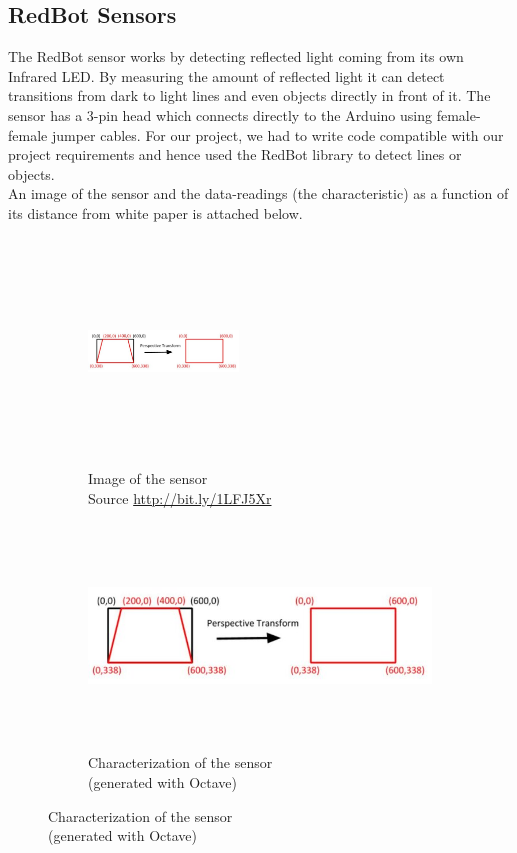 \documentclass[12pt,a4paper]{article}
\begin{document}
\begin{large}
\subsection{RedBot Sensors}

The RedBot sensor works by detecting reflected light coming from its own Infrared LED. By measuring the amount of reflected light it can detect transitions from dark to light lines and even objects directly in front of it. The sensor has a 3-pin head which connects directly to the Arduino using female-female jumper cables. For our project, we had to write code compatible with our project requirements and hence used the RedBot library to detect lines or objects. \\

An image of the sensor and the data-readings (the characteristic) as a function of its distance from white paper is attached below. 

\begin{figure} [hbp]
\centering
  \begin{subfigure}[b]{0.4\textwidth}
  \centering
  \captionsetup{justification=centering}
    \includegraphics[width=4cm, height = 6cm]{images/perspective_transform.jpg}
    \caption{Image of the sensor \\Source \protect\url{http://bit.ly/1LFJ5Xr}}
   
  \end{subfigure}
  \hspace{1cm}
  \begin{subfigure}[b]{0.4\textwidth}
  \centering
  \captionsetup{justification=centering}
    \includegraphics[width=\textwidth, height = 6cm]{images/perspective_transform.jpg}
    \caption{Characterization of the sensor \\(generated with Octave)}
    

\end{subfigure}
\end{figure}
\end{large}
\end{document}
